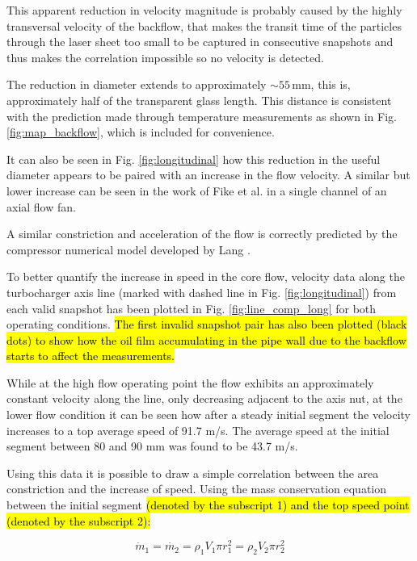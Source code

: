 This apparent reduction in velocity magnitude is probably caused by  the highly transversal velocity of the backflow, that makes the transit time of the particles through the laser sheet too small to be captured in consecutive snapshots and thus makes the correlation impossible so no velocity is detected.

The reduction in diameter extends to approximately $\sim 55\,$mm, this is, approximately half of the transparent glass length. This distance is consistent with the prediction made through temperature measurements as shown in Fig. \ref{fig:map_backflow}, which is included for convenience.

It can also be seen in Fig. \ref{fig:longitudinal} how this reduction in the useful diameter appears to be paired with an increase in the flow velocity. A similar but lower increase can be seen in the work of Fike et al. \cite{fike2014visualisation} in a single channel of an axial flow fan.

A similar constriction and acceleration of the flow is correctly predicted by the compressor numerical model developed by Lang \cite{lang2011contribucion}.

To better quantify the increase in speed in the core flow, velocity data along the turbocharger axis line (marked with dashed line in Fig. \ref{fig:longitudinal}) from each valid snapshot has been plotted in Fig. \ref{fig:line_comp_long} for both operating conditions. \hl{The first invalid snapshot pair has also been plotted (black dots) to show how the oil film accumulating in the pipe wall due to the backflow starts to affect the measurements.}

While at the high flow operating point the flow exhibits an approximately constant velocity along the line, only decreasing adjacent to the axis nut, at the lower flow condition it can be seen how after a steady initial segment the velocity increases to a top average speed of 91.7 m/s. The average speed at the initial segment between 80 and 90 mm was found to be 43.7 m/s.

Using this data it is possible to draw a simple correlation between the area constriction and the increase of speed. Using the mass conservation equation between the initial segment \hl{(denoted by the subscript 1) and the top speed point (denoted by the subscript 2):}

\begin{equation}
  \dot{m}_1 = \dot{m_2} = \rho_1 V_1 \pi r_1^2 = \rho_2 V_2 \pi r_2^2
\end{equation}

